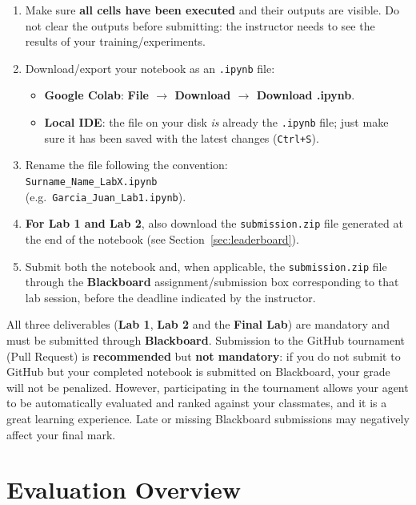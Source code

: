 \documentclass[11pt,a4paper]{article}
\begin{document}
\begin{enumerate}
    \item Make sure \textbf{all cells have been executed} and their outputs are visible. Do not clear the outputs before submitting: the instructor needs to see the results of your training/experiments.
    \item Download/export your notebook as an \texttt{.ipynb} file:
    \begin{itemize}
        \item \textbf{Google Colab}: \textbf{File $\rightarrow$ Download $\rightarrow$ Download .ipynb}.
        \item \textbf{Local IDE}: the file on your disk \textit{is} already the \texttt{.ipynb} file; just make sure it has been saved with the latest changes (\texttt{Ctrl+S}).
    \end{itemize}
    \item Rename the file following the convention: \\ \texttt{Surname\_Name\_LabX.ipynb} \\ (e.g.\ \texttt{Garcia\_Juan\_Lab1.ipynb}).
    \item \textbf{For Lab 1 and Lab 2}, also download the \texttt{submission.zip} file generated at the end of the notebook (see Section~\ref{sec:leaderboard}).
    \item Submit both the notebook and, when applicable, the \texttt{submission.zip} file through the \textbf{Blackboard} assignment/submission box corresponding to that lab session, before the deadline indicated by the instructor.
\end{enumerate}

\begin{warnbox}[Important]
All three deliverables (\textbf{Lab 1}, \textbf{Lab 2} and the \textbf{Final Lab}) are mandatory and must be submitted through \textbf{Blackboard}. Submission to the GitHub tournament (Pull Request) is \textbf{recommended} but \textbf{not mandatory}: if you do not submit to GitHub but your completed notebook is submitted on Blackboard, your grade will not be penalized. However, participating in the tournament allows your agent to be automatically evaluated and ranked against your classmates, and it is a great learning experience. Late or missing Blackboard submissions may negatively affect your final mark.
\end{warnbox}

\section{Evaluation Overview}
\end{document}
